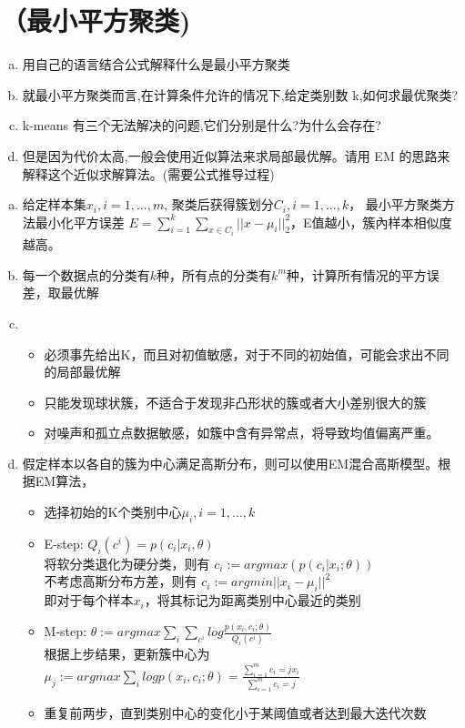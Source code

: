 \documentclass[11pt]{article}
\newenvironment{answer}{\par\color{MidnightBlue}}{\par}
\begin{document}
\section{（最小平方聚类)}
\begin{enumerate}[(a)]
    \item 用自己的语言结合公式解释什么是最小平方聚类
    \item 就最小平方聚类而言,在计算条件允许的情况下,给定类别数 k,如何求最优聚类?
    \item k-­means 有三个无法解决的问题,它们分别是什么?为什么会存在?
    \item 但是因为代价太高,一般会使用近似算法来求局部最优解。请用 EM 的思路来解释这个近似求解算法。(需要公式推导过程)
\end{enumerate}
\begin{answer}
\begin{enumerate}[(a)]
\item 给定样本集${x_i}, i = 1,..., m$, 聚类后获得簇划分${C_i, i = 1,..., k}$， 最小平方聚类方法最小化平方误差
$E = \sum_{i=1}^k\sum_{x\in C_i}||x-\mu_i||_2^2$，E值越小，簇內样本相似度越高。
\item 每一个数据点的分类有$k$种，所有点的分类有$k^m$种，计算所有情况的平方误差，取最优解
\item \begin{itemize}
  \item 必须事先给出K，而且对初值敏感，对于不同的初始值，可能会求出不同的局部最优解
  \item 只能发现球状簇，不适合于发现非凸形状的簇或者大小差别很大的簇
  \item 对噪声和孤立点数据敏感，如簇中含有异常点，将导致均值偏离严重。
\end{itemize}
\item 假定样本以各自的簇为中心满足高斯分布，则可以使用EM混合高斯模型。根据EM算法，\begin{itemize}
  \item 选择初始的K个类别中心${\mu_i}, i = 1,..., k$
  \item E-step: $Q_i(c^i) = p(c_i|x_i,\theta)$ \\
  将软分类退化为硬分类，则有 $c_i := arg max(p(c_i|x_i;\theta))$ \\
  不考虑高斯分布方差，则有 $c_i := arg min||x_i - \mu_i||^2$  \\
  即对于每个样本$x_i$，将其标记为距离类别中心最近的类别
  \item M-step: $\theta := arg max\sum_i\sum_{c^i}log\frac{p(x_i,c_i;\theta)}{Q_i(c^i)}$ \\
  根据上步结果，更新簇中心为 $\mu_j := arg max\sum_i log{p(x_i,c_i;\theta)} = \frac{\sum_{i=1}^m{c_i=j}x_i}{\sum_{i=1}^m{c_i=j}}$ \\
  \item 重复前两步，直到类别中心的变化小于某阈值或者达到最大迭代次数
\end{itemize}
\end{enumerate}
\end{answer}
\end{document}
